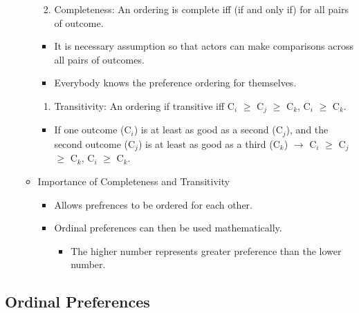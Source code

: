\documentclass[]{book}
\providecommand{\tightlist}{%
  \setlength{\itemsep}{0pt}\setlength{\parskip}{0pt}}
\begin{document}
\begin{itemize}
\begin{itemize}
    \begin{enumerate}
    \def\labelenumi{\arabic{enumi}.}
    \tightlist
    \item
      Completeness: An ordering is complete iff (if and only if) for all pairs of outcome.
    \end{enumerate}

    \begin{itemize}
    \tightlist
    \item
      It is necessary assumption so that actors can make comparisons across all pairs of outcomes.
    \item
      Everybody knows the preference ordering for themselves.
    \end{itemize}

    \begin{enumerate}
    \def\labelenumi{\arabic{enumi}.}
    \setcounter{enumi}{1}
    \tightlist
    \item
      Transitivity: An ordering if transitive iff C\(_i\) \(\geq\) C\(_j\) \(\geq\) C\(_k\), C\(_i\) \(\geq\) C\(_k\).
    \end{enumerate}

    \begin{itemize}
    \tightlist
    \item
      If one outcome (C\(_i\)) is at least as good as a second (C\(_j\)), and the second outcome (C\(_j\)) is at least as good as a third (C\(_k\)) \(\rightarrow\) C\(_i\) \(\geq\) C\(_j\) \(\geq\) C\(_k\), C\(_i\) \(\geq\) C\(_k\).
    \end{itemize}
  \item
    Importance of Completeness and Transitivity

    \begin{itemize}
    \tightlist
    \item
      Allows prefrences to be ordered for each other.
    \item
      Ordinal preferences can then be used mathematically.

      \begin{itemize}
      \tightlist
      \item
        The higher number represents greater preference than the lower number.
      \end{itemize}
    \end{itemize}
  \end{itemize}
\end{itemize}

\hypertarget{ordinal-preferences}{%
\subsection{Ordinal Preferences}\label{ordinal-preferences}}
\end{document}
